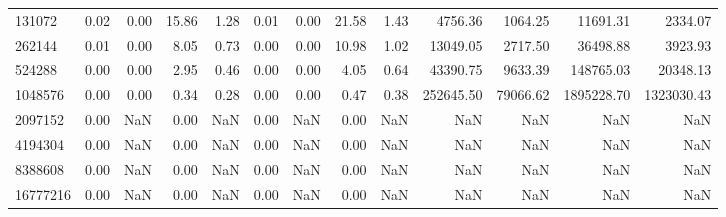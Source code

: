 \begin{tabular}{lrrrrrrrrrrrr}
131072 & 0.02 & 0.00 & 15.86 & 1.28 & 0.01 & 0.00 & 21.58 & 1.43 & 4756.36 & 1064.25 & 11691.31 & 2334.07 \\
262144 & 0.01 & 0.00 & 8.05 & 0.73 & 0.00 & 0.00 & 10.98 & 1.02 & 13049.05 & 2717.50 & 36498.88 & 3923.93 \\
524288 & 0.00 & 0.00 & 2.95 & 0.46 & 0.00 & 0.00 & 4.05 & 0.64 & 43390.75 & 9633.39 & 148765.03 & 20348.13 \\
1048576 & 0.00 & 0.00 & 0.34 & 0.28 & 0.00 & 0.00 & 0.47 & 0.38 & 252645.50 & 79066.62 & 1895228.70 & 1323030.43 \\
2097152 & 0.00 & NaN & 0.00 & NaN & 0.00 & NaN & 0.00 & NaN & NaN & NaN & NaN & NaN \\
4194304 & 0.00 & NaN & 0.00 & NaN & 0.00 & NaN & 0.00 & NaN & NaN & NaN & NaN & NaN \\
8388608 & 0.00 & NaN & 0.00 & NaN & 0.00 & NaN & 0.00 & NaN & NaN & NaN & NaN & NaN \\
16777216 & 0.00 & NaN & 0.00 & NaN & 0.00 & NaN & 0.00 & NaN & NaN & NaN & NaN & NaN \\
\bottomrule
\end{tabular}
